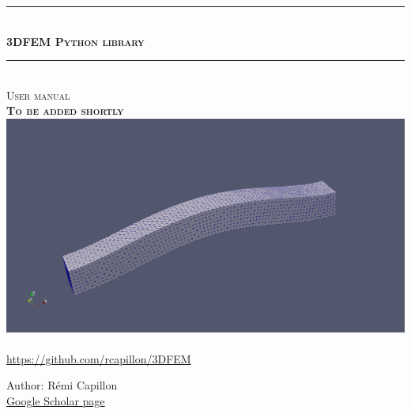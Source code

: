 \documentclass[12pt, openany]{report}
\newcommand{\HRule}{\rule{\linewidth}{0.5mm}}
\begin{document}
\begin{titlepage}
  \begin{sffamily}
  \begin{center}
    \HRule \\[0.4cm]
    { \huge \bfseries \textsc{3DFEM Python library}\\[0.4cm] }
    \HRule \\[0.5cm]
    
    \textsc{\Large User manual}\\[1cm]
    
    \textsc{\Large \bfseries To be added shortly}\\[1.8cm]
    
    \includegraphics[scale=0.2]{3DFEM_image1.png}~\\[3cm]

    {\large \url{https://github.com/rcapillon/3DFEM}}\\[2cm]

    \begin{center}
    	\small Author: Rémi Capillon\\
    	\small \href{https://scholar.google.com/citations?user=q0jsk88AAAAJ}{Google Scholar page}\\
    \end{center}

    \vfill

    
  \end{center}
  \end{sffamily}
\end{titlepage}


\end{document}
